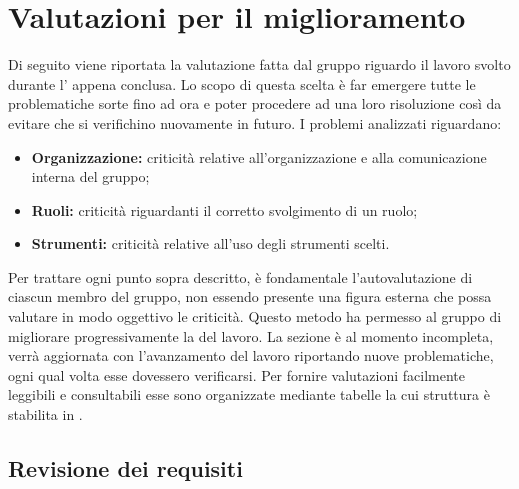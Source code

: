 \appendix
\section{Valutazioni per il miglioramento}
\label{miglioramento}
Di seguito viene riportata la valutazione fatta dal gruppo {\Gruppo} riguardo il lavoro svolto durante l' appena conclusa. Lo scopo di questa scelta è far emergere tutte le problematiche sorte fino ad ora e poter procedere ad una loro risoluzione  così da evitare che si verifichino nuovamente in futuro.
I problemi analizzati riguardano:
\begin{itemize}
	\item \textbf{Organizzazione:} criticità relative all'organizzazione e alla comunicazione interna del gruppo;
	\item \textbf{Ruoli:} criticità riguardanti il corretto svolgimento di un ruolo;
	\item \textbf{Strumenti:} criticità relative all'uso degli strumenti scelti.
\end{itemize}
Per trattare ogni punto sopra descritto, è fondamentale l'autovalutazione di ciascun membro del gruppo, non essendo presente una figura esterna che possa valutare in modo oggettivo le criticità. Questo metodo ha permesso al gruppo di migliorare progressivamente la  del lavoro. La sezione è al momento incompleta, verrà aggiornata con l’avanzamento del lavoro riportando nuove problematiche, ogni qual volta esse dovessero verificarsi. Per fornire valutazioni facilmente leggibili e consultabili esse sono organizzate mediante tabelle la cui struttura è stabilita in .
\subsection{Revisione dei requisiti}
